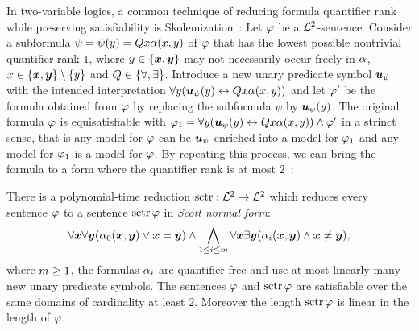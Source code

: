 In two-variable logics, a common technique of reducing formula quantifier rank
while preserving satisfiability is Skolemization~\cite{gradel1999logics}:
Let $\varphi$ be a $\mathcal{L}^{2}$-sentence.
Consider a subformula $\psi = \psi(y) = Qx \alpha(x,y)$ of $\varphi$ that
has the lowest possible nontrivial quantifier rank $1$, where
$y\in\left\{\bm{x},\bm{y}\right\}$ may not necessarily occur freely in $\alpha$, $x \in
\left\{\bm{x},\bm{y}\right\}\setminus\left\{y\right\}$ and $Q \in \left\{\forall,\exists\right\}$.
Introduce a new unary predicate symbol $\bm{u}_{\psi}$ with the intended
interpretation $\forall y(\bm{u}_{\psi}(y) \leftrightarrow Qx \alpha(x,y))$ and
let ${\varphi'}$ be the formula obtained from $\varphi$ by replacing the subformula
$\psi$ by $\bm{u}_{\psi}(y)$.
The original formula $\varphi$ is equisatisfiable with
$\varphi_1 = \forall y(\bm{u}_{\psi}(y) \leftrightarrow Qx \alpha(x,y)) \land
{\varphi'}$ in a strinct sense, that is any model for $\varphi$ can be
$\bm{u}_{\psi}$-enriched into a model for $\varphi_1$ and any model for $\varphi_1$ is a
model for $\varphi$.
By repeating this process, we can bring the formula to a form where the
quantifier rank is at most $2$~\cite{scott1962decision,gradel1999logics}:
\begin{theorem}[Scott]
There is a polynomial-time reduction $\operatorname{sctr}: \mathcal{L}^{2} \to \mathcal{L}^{2}$ which reduces
every sentence $\varphi$ to a sentence $\operatorname{sctr}\varphi$ in \emph{Scott normal form}:
\[
  \forall\bm{x}\forall\bm{y}(\alpha_{0}(\bm{x},\bm{y}) \lor \bm{x} = \bm{y}) \land
  \bigwedge_{1 \leq i \leq m} \forall\bm{x}\exists\bm{y}
  (\alpha_{i}(\bm{x},\bm{y}) \land \bm{x} \neq \bm{y}),
\]
where $m\geq1$, the formulas $\alpha_{i}$ are quantifier-free and use at most
linearly many new unary predicate symbols.
The sentences $\varphi$ and $\operatorname{sctr}\varphi$ are satisfiable over the same domains of
cardinality at least $2$.
Moreover the length $\operatorname{sctr}\varphi$ is linear in the length of $\varphi$.
\end{theorem}